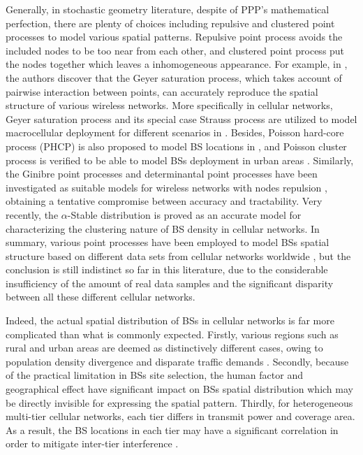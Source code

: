 Generally, in stochastic geometry literature, despite of PPP's mathematical perfection, there are plenty of choices including repulsive and clustered point processes \cite{chiu2013stochastic} to model various spatial patterns. Repulsive point process avoids the included nodes to be too near from each other, and clustered point process put the nodes together which leaves a inhomogeneous appearance. For example, in \cite{riihijarvi2010modeling}, the authors discover that the Geyer saturation process, which takes account of pairwise interaction between points, can accurately reproduce the spatial structure of various wireless networks. More specifically in cellular networks, Geyer saturation process and its special case Strauss process are utilized to model macrocellular deployment for different scenarios in \cite{taylor2012pairwise}. Besides, Poisson hard-core process (PHCP) is also proposed to model BS locations in \cite{guo2013spatial}, and Poisson cluster process is verified to be able to model BSs deployment in urban areas \cite{lee2013stochastic}. Similarly, the Ginibre point processes and determinantal point processes have been investigated as suitable models for wireless networks with nodes repulsion \cite{deng2014ginibre,li2014fitting}, obtaining a tentative compromise between accuracy and tractability. Very recently, the $\alpha$-Stable distribution \cite{zhou2015alpha} is proved as an accurate model for characterizing the clustering nature of BS density in cellular networks. In summary, various point processes have been employed to model BSs spatial structure based on different data sets from cellular networks worldwide \cite{elsawy2013stochastic}, but the conclusion is still indistinct so far in this literature, due to the considerable insufficiency of the amount of real data samples and the significant disparity between all these different cellular networks.

Indeed, the actual spatial distribution of BSs in cellular networks is far more complicated than what is commonly expected. Firstly, various regions such as rural and urban areas are deemed as distinctively different cases, owing to population density divergence and disparate traffic demands \cite{taylor2012pairwise}. Secondly, because of the practical limitation in BSs site selection, the human factor and geographical effect have significant impact on BSs spatial distribution which may be directly invisible for expressing the spatial pattern. Thirdly, for heterogeneous multi-tier cellular networks, each tier differs in transmit power and coverage area. As a result, the BS locations in each tier may have a significant correlation in order to mitigate inter-tier interference \cite{cho2013energy,deng2014heterogeneous}.

